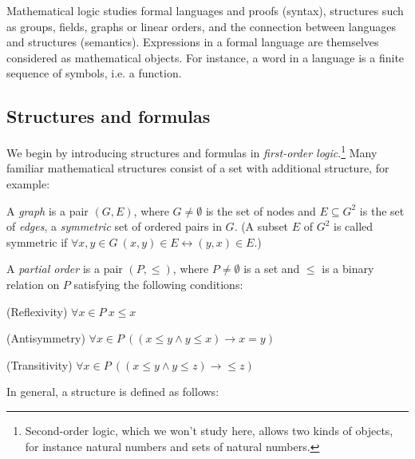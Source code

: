 \documentclass[a4paper, 11pt]{amsart}
\theoremstyle{remark}
\newenvironment{enumerate-(a)}{\begin{enumerate}[label={\upshape (\alph*)}, leftmargin=2pc]}{\end{enumerate}}
\newenvironment{enumerate-(i)}{\begin{enumerate}[label={\upshape (\roman*)}, leftmargin=2pc]}{\end{enumerate}}
\begin{document}
Mathematical logic studies formal languages and proofs (syntax), structures such as groups, fields, graphs or linear orders, and the connection between languages and structures (semantics). 
Expressions in a formal language are themselves considered as mathematical objects. For instance, a word in a language is a finite sequence of symbols, i.e. a function. 




\subsection{Structures and formulas} 

We begin by introducing structures and formulas in \emph{first-order logic}.\footnote{Second-order logic, which we won't study here, allows two kinds of objects, for instance natural numbers and sets of natural numbers.} 
Many familiar mathematical structures consist of a set with additional structure, for example: 

\begin{enumerate-(a)} 
\item 
A \emph{graph} is a pair $(G,E)$, where $G\neq\emptyset$ is the set of nodes and $E\subseteq G^2$ is the set of \emph{edges}, a \emph{symmetric} set of ordered pairs in $G$. 
(A subset $E$ of $G^2$ is called symmetric if $\forall x,y\in G\ (x,y)\in E \leftrightarrow (y,x)\in E$.) 
\item 
A \emph{partial order} is a pair $(P,\leq)$, where $P\neq\emptyset$ is a set and $\leq$ is a binary relation on $P$ satisfying the following conditions: 
\begin{enumerate-(i)} 
\item 
(Reflexivity)  $\forall x\in P\ x\leq x$ 
\item 
(Antisymmetry)  $\forall x\in P\ ((x\leq y \wedge y\leq x) \rightarrow x=y)$ 
\item 
(Transitivity)  $\forall x\in P\ ((x\leq y \wedge y\leq z) \rightarrow \leq z)$ 
\end{enumerate-(i)} 
\end{enumerate-(a)} 

In general, a structure is defined as follows: 
\end{document}
